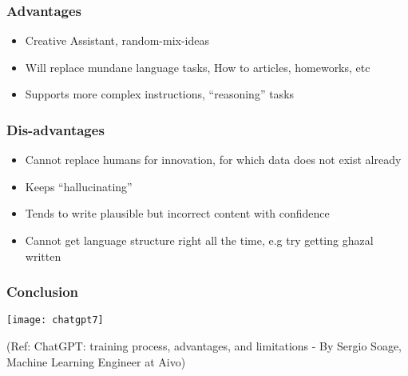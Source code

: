 \begin{frame}[fragile]\frametitle{Advantages}


\begin{itemize}
\item Creative Assistant, random-mix-ideas
\item Will replace mundane language tasks, How to articles, homeworks, etc
\item Supports more complex instructions, ``reasoning'' tasks
\end{itemize}	 

\end{frame}

\begin{frame}[fragile]\frametitle{Dis-advantages}


\begin{itemize}
\item Cannot replace humans for innovation, for which data does not exist already
\item Keeps ``hallucinating''
\item Tends to write plausible but incorrect content with confidence
\item Cannot get language structure right all the time, e.g try getting ghazal written
\end{itemize}	 

\end{frame}

\begin{frame}[fragile]\frametitle{Conclusion}



			\begin{center}
			\texttt{[image: chatgpt7]}
			
			\end{center}		
			
			{\tiny (Ref: ChatGPT: training process, advantages, and limitations - By Sergio Soage, Machine Learning Engineer at Aivo)}
			

\end{frame}